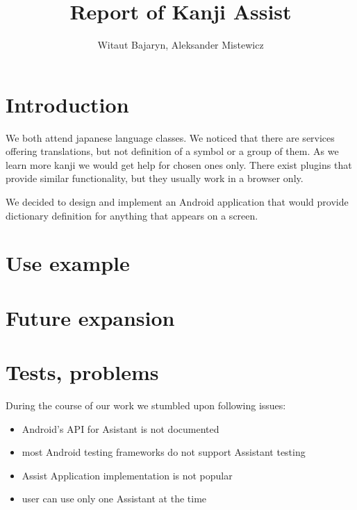 \documentclass[11pt,a4paper]{article}
\title{Report of Kanji Assist}
\author{Witaut Bajaryn, Aleksander Mistewicz}
\begin{document}
\maketitle
\newpage

\section{Introduction}

We both attend japanese language classes. We noticed that there are services
offering translations, but not definition of a symbol or a group of them.
As we learn more kanji we would get help for chosen ones only.
There exist plugins that provide similar functionality, but they usually
work in a browser only.

We decided to design and implement an Android application that would
provide dictionary definition for anything that appears on a screen.

\section{Use example}

\section{Future expansion}

\section{Tests, problems}

During the course of our work we stumbled upon following issues:
\begin{itemize}
    \item Android's API for Asistant is not documented
    \item most Android testing frameworks do not support Assistant testing
    \item Assist Application implementation is not popular
    \item user can use only one Assistant at the time
\end{itemize}
\end{document}

